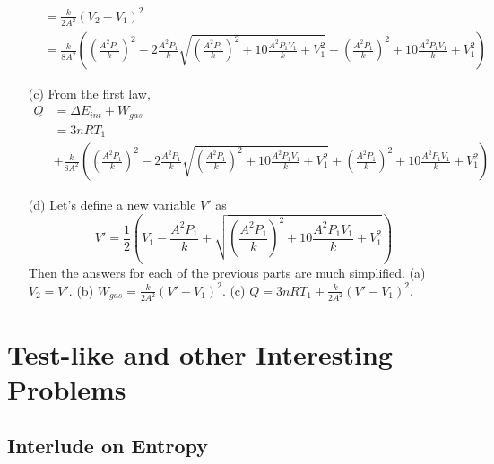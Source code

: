 \documentclass{article}
\begin{document}
\begin{itemize}
\begin{align*}
	&= \frac{k}{2A^2}\left(V_2-V_1\right)^2 \\
	&= \frac{k}{8A^2}\left(\left(\frac{A^2P_1}{k}\right)^2-2\frac{A^2P_1}{k}\sqrt{\left(\frac{A^2P_1}{k}\right)^2+10\frac{A^2P_1V_1}{k}+V_1^2}+\left(\frac{A^2P_1}{k}\right)^2+10\frac{A^2P_1V_1}{k} + V_1^2\right)
	\end{align*}
	\item[(c)] From the first law,
	\begin{align*}
	Q &= \Delta E_{int} + W_{gas} \\
	&= 3nRT_1 \\
	&+ \frac{k}{8A^2}\left(\left(\frac{A^2P_1}{k}\right)^2-2\frac{A^2P_1}{k}\sqrt{\left(\frac{A^2P_1}{k}\right)^2+10\frac{A^2P_1V_1}{k}+V_1^2}+\left(\frac{A^2P_1}{k}\right)^2+10\frac{A^2P_1V_1}{k} + V_1^2\right)
	\end{align*}
	\item[(d)] Let's define a new variable $V'$ as
	\begin{equation}
	V' = \frac{1}{2}\left(V_1 - \frac{A^2P_1}{k} + \sqrt{\left(\frac{A^2P_1}{k}\right)^2 + 10\frac{A^2P_1V_1}{k} + V_1^2}\right)
	\end{equation}
	Then the answers for each of the previous parts are much simplified. (a) $V_2 = V'$. (b) $W_{gas} = \frac{k}{2A^2}\left(V'-V_1\right)^2$. (c) $Q = 3nRT_1 + \frac{k}{2A^2}\left(V'-V_1\right)^2$.
\end{itemize}

\section{Test-like and other Interesting Problems}

\subsection{Interlude on Entropy}
\end{document}
